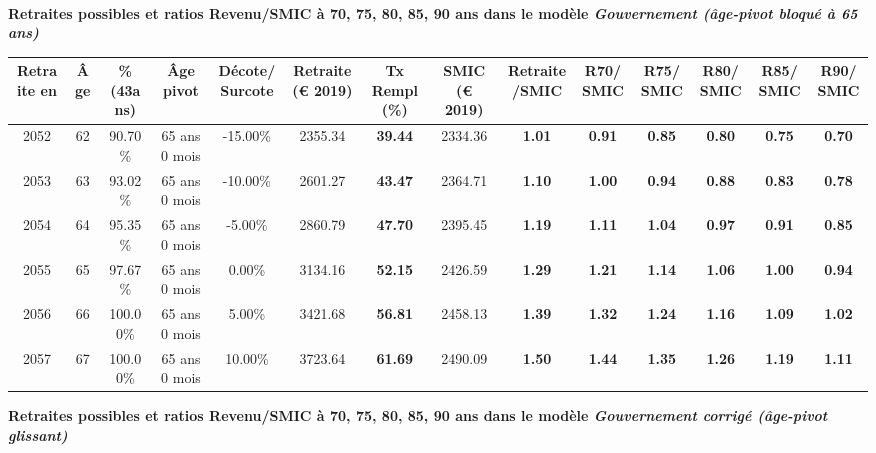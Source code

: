  ~\\{\bf \noindent Retraites possibles et ratios Revenu/SMIC à 70, 75, 80, 85, 90 ans dans le modèle \emph{Gouvernement (âge-pivot bloqué à 65 ans)}}  
 
\begin{adjustbox}{max width=\textwidth} 
\begin{tabular}[htb]{|c|c||c|c|c||c|c||c|c||c|c|c|c|c|} 
\hline 
 Retraite en &  Âge &  \%(43ans) &  Âge pivot &  Décote/Surcote &  Retraite (\euro{} 2019) &  Tx Rempl(\%) &  SMIC (\euro{} 2019) &  Retraite/SMIC &  R70/SMIC &  R75/SMIC &  R80/SMIC &  R85/SMIC &  R90/SMIC \\ 
\hline \hline 
 2052 &  62 &  90.70\% &  65 ans 0 mois &  -15.00\% &  2355.34 &  {\bf 39.44} &  2334.36 &  {\bf 1.01} &  {\bf {\color{red} 0.91}} &  {\bf {\color{red} 0.85}} &  {\bf {\color{red} 0.80}} &  {\bf {\color{red} 0.75}} &  {\bf {\color{red} 0.70}} \\ 
\hline 
 2053 &  63 &  93.02\% &  65 ans 0 mois &  -10.00\% &  2601.27 &  {\bf 43.47} &  2364.71 &  {\bf 1.10} &  {\bf 1.00} &  {\bf {\color{red} 0.94}} &  {\bf {\color{red} 0.88}} &  {\bf {\color{red} 0.83}} &  {\bf {\color{red} 0.78}} \\ 
\hline 
 2054 &  64 &  95.35\% &  65 ans 0 mois &  -5.00\% &  2860.79 &  {\bf 47.70} &  2395.45 &  {\bf 1.19} &  {\bf 1.11} &  {\bf 1.04} &  {\bf {\color{red} 0.97}} &  {\bf {\color{red} 0.91}} &  {\bf {\color{red} 0.85}} \\ 
\hline 
 2055 &  65 &  97.67\% &  65 ans 0 mois &  0.00\% &  3134.16 &  {\bf 52.15} &  2426.59 &  {\bf 1.29} &  {\bf 1.21} &  {\bf 1.14} &  {\bf 1.06} &  {\bf {\color{red} 1.00}} &  {\bf {\color{red} 0.94}} \\ 
\hline 
 2056 &  66 &  100.00\% &  65 ans 0 mois &  5.00\% &  3421.68 &  {\bf 56.81} &  2458.13 &  {\bf 1.39} &  {\bf 1.32} &  {\bf 1.24} &  {\bf 1.16} &  {\bf 1.09} &  {\bf 1.02} \\ 
\hline 
 2057 &  67 &  100.00\% &  65 ans 0 mois &  10.00\% &  3723.64 &  {\bf 61.69} &  2490.09 &  {\bf 1.50} &  {\bf 1.44} &  {\bf 1.35} &  {\bf 1.26} &  {\bf 1.19} &  {\bf 1.11} \\ 
\hline 
\hline 
\end{tabular} 
\end{adjustbox} 
 
 \vspace{0.1cm} 
{\bf \noindent Retraites possibles et ratios Revenu/SMIC à 70, 75, 80, 85, 90 ans dans le modèle \emph{Gouvernement corrigé (âge-pivot glissant)}}  
 
